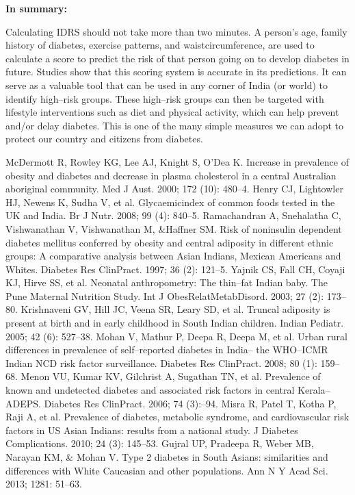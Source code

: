 \noindent\textbf{In summary:}

Calculating IDRS should not take more than two minutes. A person’s age, family history of diabetes, exercise patterns, and waist\break circumference, are used to calculate a score to predict the risk of that person going on to develop diabetes in future. Studies show that this scoring system is accurate in its predictions. It can serve as a valuable tool that can be used in any corner of India (or world) to identify high–risk groups. These high–risk groups can then be targeted with lifestyle interventions such as diet and physical activity, which can help prevent and/or delay diabetes. This is one of the many simple measures we can adopt to protect our country and citizens from diabetes.


\begin{thebibliography}{99}
 McDermott R, Rowley KG, Lee AJ, Knight S, O’Dea K. Increase in prevalence of obesity and diabetes and decrease in plasma chole\-sterol in a central Australian aboriginal community. Med J Aust. 2000; 172 (10): 480–4.
  Henry CJ, Lightowler HJ, Newens K, Sudha V, et al. Glycaemic\break index of common foods tested in the UK and India. Br J Nutr. 2008; 99 (4): 840–5.
  Ramachandran A, Snehalatha C, Vishwanathan V, Vishwanathan M, \&Haffner SM. Risk of noninsulin dependent diabetes mellitus conferred by obesity and central adiposity in different ethnic groups: A comparative analysis between Asian Indians, Mexican Americans and Whites. Diabetes Res ClinPract. 1997; 36 (2): 121–5.
  Yajnik CS, Fall CH, Coyaji KJ, Hirve SS, et al. Neonatal anthropo\-metry: The thin–fat Indian baby. The Pune Maternal Nutrition Study. Int J ObesRelatMetabDisord. 2003; 27 (2): 173–80.
  Krishnaveni GV, Hill JC, Veena SR, Leary SD, et al. Truncal adiposity is present at birth and in early childhood in South Indian children. Indian Pediatr. 2005; 42 (6): 527–38.
  Mohan V, Mathur P, Deepa R, Deepa M, et al. Urban rural differe\-nces in prevalence of self–reported diabetes in India– the WHO–ICMR Indian NCD risk factor surveillance. Diabetes Res ClinPract. 2008; 80 (1): 159–68.
  Menon VU, Kumar KV, Gilchrist A, Sugathan TN, et al. Prevalence of known and undetected diabetes and associated risk fa\-ctors in central Kerala–ADEPS. Diabetes Res ClinPract. 2006; 74 (3):–94.
  Misra R, Patel T, Kotha P, Raji A, et al. Prevalence of diabetes, metabolic syndrome, and cardiovascular risk factors in US Asian Indians: results from a national study. J Diabetes Complications. 2010; 24 (3): 145–53.
  Gujral UP, Pradeepa R, Weber MB, Narayan KM, \& Mohan V. Type 2 diabetes in South Asians: similarities and differences with White Caucasian and other populations. Ann N Y Acad Sci. 2013; 1281: 51–63.
 \end{thebibliography}


